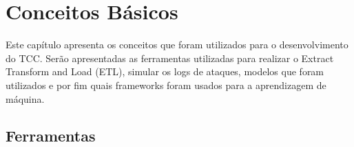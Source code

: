 
\chapter{Conceitos Básicos}
\label{cap:concepts}

Este capítulo apresenta os conceitos que foram utilizados para o desenvolvimento do TCC. Serão apresentadas
as ferramentas utilizadas para realizar o Extract Transform and Load (ETL), simular os logs de ataques, modelos
que foram utilizados e por fim quais frameworks foram usados para a aprendizagem de máquina.

\section{Ferramentas}

